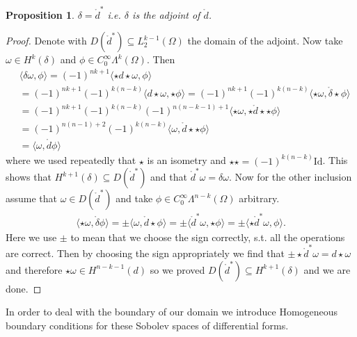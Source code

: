 \documentclass[12pt,a4paper]{article}
\numberwithin{equation}{subsection}
\numberwithin{lemma}{subsection}
\newtheorem{proposition}[lemma]{Proposition}
\theoremstyle{definition}
\newcommand{\smoothcompforms}[2]{C_0^\infty \Lambda^{#1}(#2)}
\begin{document}
\begin{proposition}
    $\delta = \mathring{d}^*$ i.e. $\delta$ is the adjoint of $\mathring{d}$.
\end{proposition}
\begin{proof}
    Denote with
    $D(\mathring{d}^*) \subseteq L_2^{k-1}(\Omega)$ the domain of the adjoint.
    Now take $\omega \in H^k(\delta)$ and $\phi \in 
    \smoothcompforms{k}{\Omega}$.
    Then 
    \begin{align*}
        &\langle \delta \omega, \phi \rangle = 
        (-1)^{nk+1} \langle \star d\star \omega, \phi \rangle \\  
        &= (-1)^{nk+1} (-1)^{k(n-k)} \langle d\star \omega, \star\phi \rangle =
        (-1)^{nk+1} (-1)^{k(n-k)} 
            \langle \star \omega, \mathring{\delta}\star\phi \rangle \\
        &= (-1)^{nk+1} (-1)^{k(n-k)} (-1)^{n(n-k-1)+1}
            \langle \star \omega, \star\mathring{d}\star\star\phi \rangle \\
        &=(-1)^{n(n-1)+2} (-1)^{k(n-k)} \langle \omega, 
            \mathring{d}\star\star\phi \rangle\\
        &= \langle \omega, \mathring{d}\phi \rangle
    \end{align*}
    where we used repeatedly that $\star$ is an isometry and 
    $\star\star = (-1)^{k(n-k)}\text{Id}$. 
    This shows that $H^{k+1}(\delta) \subseteq 
    D(\mathring{d}^*)$ and that $\mathring{d}^* \omega = \delta \omega$. Now for 
    the other inclusion assume that $\omega \in D(\mathring{d}^*)$ and take 
    $\phi \in \smoothcompforms{n-k}{\Omega}$ arbitrary.
    \begin{align*}
        \langle \star\omega, \mathring{\delta}\phi \rangle = \pm 
        \langle \omega, \mathring{d}\star\phi \rangle = 
        \pm \langle \mathring{d}^* \omega, \star\phi \rangle = 
        \pm \langle \star\mathring{d}^* \omega, \phi \rangle.
    \end{align*} 
    Here we use $\pm$ to mean that we choose the sign correctly, s.t. all the
    operations are correct. Then by choosing the sign appropriately we find that
    $ \pm \star\mathring{d}^* \omega = d\star\omega$ and therefore 
    $\star\omega \in H^{n-k-1}(d)$ so we proved $D(\mathring{d}^*) \subseteq 
    H^{k+1}(\delta)$ and we are done.    
\end{proof}

In order to deal with the boundary of our domain we introduce Homogeneous
boundary conditions for these Sobolev spaces of differential forms.
\end{document}
